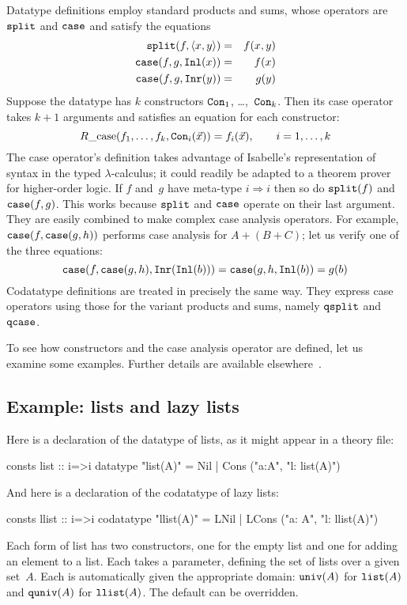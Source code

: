 \documentclass[12pt,a4paper]{article}
\let\To=\Rightarrow
\newcommand\split{\hbox{\tt split}}
\newcommand\univ{\hbox{\tt univ}}
\newcommand\Inl{\hbox{\tt Inl}}
\newcommand\Inr{\hbox{\tt Inr}}
\newcommand\case{\hbox{\tt case}}
\newcommand\lst{\hbox{\tt list}}
\newcommand\quniv{\hbox{\tt quniv}}
\newcommand\llist{\hbox{\tt llist}}
\newcommand\qsplit{\hbox{\tt qsplit}}
\newcommand\qcase{\hbox{\tt qcase}}
\newcommand\Con{\hbox{\tt Con}}
\begin{document}
Datatype definitions employ standard products and sums, whose operators are
$\split$ and $\case$ and satisfy the equations
\begin{eqnarray*}
  \split(f,\pair{x,y})  & = &  f(x,y) \\
  \case(f,g,\Inl(x))    & = &  f(x)   \\
  \case(f,g,\Inr(y))    & = &  g(y)
\end{eqnarray*}
Suppose the datatype has $k$ constructors $\Con_1$, \ldots,~$\Con_k$.  Then
its case operator takes $k+1$ arguments and satisfies an equation for each
constructor:
\[ R\hbox{\_case}(f_1,\ldots,f_k, {\tt Con}_i(\vec{x})) = f_i(\vec{x}),
    \qquad i = 1, \ldots, k
\]
The case operator's definition takes advantage of Isabelle's representation of
syntax in the typed $\lambda$-calculus; it could readily be adapted to a
theorem prover for higher-order logic.  If $f$ and~$g$ have meta-type $i\To i$
then so do $\split(f)$ and $\case(f,g)$.  This works because $\split$ and
$\case$ operate on their last argument.  They are easily combined to make
complex case analysis operators.  For example, $\case(f,\case(g,h))$ performs
case analysis for $A+(B+C)$; let us verify one of the three equations:
\[ \case(f,\case(g,h), \Inr(\Inl(b))) = \case(g,h,\Inl(b)) = g(b) \]
Codatatype definitions are treated in precisely the same way.  They express
case operators using those for the variant products and sums, namely
$\qsplit$ and~$\qcase$.

\medskip

To see how constructors and the case analysis operator are defined, let us
examine some examples.  Further details are available
elsewhere~\cite{paulson-set-II}.


\subsection{Example: lists and lazy lists}\label{lists-sec}
Here is a declaration of the datatype of lists, as it might appear in a theory
file:
\begin{ttbox} 
consts  list :: i=>i
datatype "list(A)" = Nil | Cons ("a:A", "l: list(A)")
\end{ttbox}
And here is a declaration of the codatatype of lazy lists:
\begin{ttbox}
consts  llist :: i=>i
codatatype "llist(A)" = LNil | LCons ("a: A", "l: llist(A)")
\end{ttbox}

Each form of list has two constructors, one for the empty list and one for
adding an element to a list.  Each takes a parameter, defining the set of
lists over a given set~$A$.  Each is automatically given the appropriate
domain: $\univ(A)$ for $\lst(A)$ and $\quniv(A)$ for $\llist(A)$.  The default
can be overridden.
\end{document}
